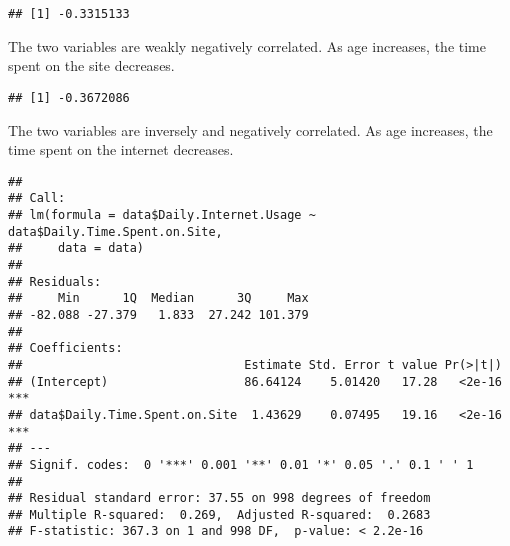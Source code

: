 \documentclass[
]{article}
\newenvironment{Shaded}{\begin{snugshade}}{\end{snugshade}}
\newcommand{\AttributeTok}[1]{\textcolor[rgb]{0.77,0.63,0.00}{#1}}
\newcommand{\CommentTok}[1]{\textcolor[rgb]{0.56,0.35,0.01}{\textit{#1}}}
\newcommand{\DocumentationTok}[1]{\textcolor[rgb]{0.56,0.35,0.01}{\textbf{\textit{#1}}}}
\newcommand{\FunctionTok}[1]{\textcolor[rgb]{0.00,0.00,0.00}{#1}}
\newcommand{\NormalTok}[1]{#1}
\newcommand{\OtherTok}[1]{\textcolor[rgb]{0.56,0.35,0.01}{#1}}
\newcommand{\SpecialCharTok}[1]{\textcolor[rgb]{0.00,0.00,0.00}{#1}}
\begin{document}
\begin{verbatim}
## [1] -0.3315133
\end{verbatim}

The two variables are weakly negatively correlated. As age increases,
the time spent on the site decreases.

\begin{Shaded}
\end{Shaded}

\begin{verbatim}
## [1] -0.3672086
\end{verbatim}

The two variables are inversely and negatively correlated. As age
increases, the time spent on the internet decreases.

\begin{Shaded}
\end{Shaded}

\begin{verbatim}
## 
## Call:
## lm(formula = data$Daily.Internet.Usage ~ data$Daily.Time.Spent.on.Site, 
##     data = data)
## 
## Residuals:
##     Min      1Q  Median      3Q     Max 
## -82.088 -27.379   1.833  27.242 101.379 
## 
## Coefficients:
##                               Estimate Std. Error t value Pr(>|t|)    
## (Intercept)                   86.64124    5.01420   17.28   <2e-16 ***
## data$Daily.Time.Spent.on.Site  1.43629    0.07495   19.16   <2e-16 ***
## ---
## Signif. codes:  0 '***' 0.001 '**' 0.01 '*' 0.05 '.' 0.1 ' ' 1
## 
## Residual standard error: 37.55 on 998 degrees of freedom
## Multiple R-squared:  0.269,  Adjusted R-squared:  0.2683 
## F-statistic: 367.3 on 1 and 998 DF,  p-value: < 2.2e-16
\end{verbatim}
\end{document}
